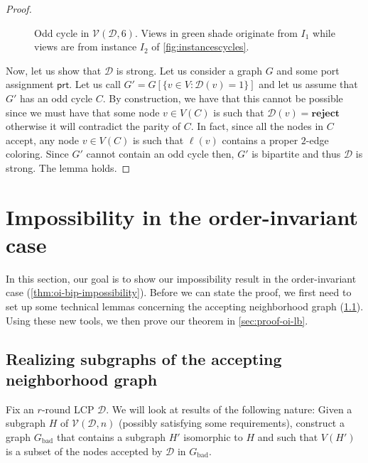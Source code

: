 \documentclass[11pt]{article}
\newcommand*{\alvgd}{\mathcal{V}(\mathcal{D},n)}
\newcommand*{\bad}{\mathrm{bad}}
\newcommand*{\ports}{\mathsf{prt}}
\begin{document}
\begin{proof}
\begin{figure}
    \centering
    \resizebox{\textwidth}{!}{%
      
    }
  \caption{Odd cycle in $\mathcal{V}(\mathcal{D},6)$.
    Views in green shade originate from $I_1$ while views are from instance
    $I_2$ of \cref{fig:instancescycles}.}
    \label{fig:oddcyclecycles}
\end{figure}


Now, let us show that $\mathcal{D}$ is strong. Let us consider a graph $G$ and some port assignment $\ports$. Let us call $G'=G [\{v\in V: \mathcal{D}(v)=1\}]$ and let us assume that $G'$ has an odd cycle $C$. By construction, we have that this cannot be possible since we must have that some node $v \in V(C)$ is such that $\mathcal{D}(v) = \textbf{reject}$ otherwise it will contradict the parity of $C$. In fact, since all the nodes in $C$ accept, any node $v \in V(C)$ is such that $\ell(v)$ contains a proper $2$-edge coloring. Since $G'$ cannot contain an odd cycle then, $G'$ is bipartite and thus $\mathcal{D}$ is strong. The lemma holds.

\end{proof}

\section{Impossibility in the order-invariant case}
\label{sec:oi-lb}

In this section, our goal is to show our impossibility result in the
order-invariant case (\cref{thm:oi-bip-impossibility}).
Before we can state the proof, we first need to set up some technical lemmas
concerning the accepting neighborhood graph (\cref{sec:stgo-postulate}).  
Using these new tools, we then prove our theorem in
\cref{sec:proof-oi-lb}.

\subsection{Realizing subgraphs of the accepting neighborhood graph}
\label{sec:stgo-postulate}

Fix an $r$-round LCP $\mathcal{D}$.
We will look at results of the following nature:
Given a subgraph $H$ of $\alvgd$ (possibly satisfying some requirements),
construct a graph $G_\bad$ that contains a subgraph $H'$ isomorphic to $H$ and
such that $V(H')$ is a subset of the nodes accepted by $\mathcal{D}$ in
$G_\bad$.
\end{document}
